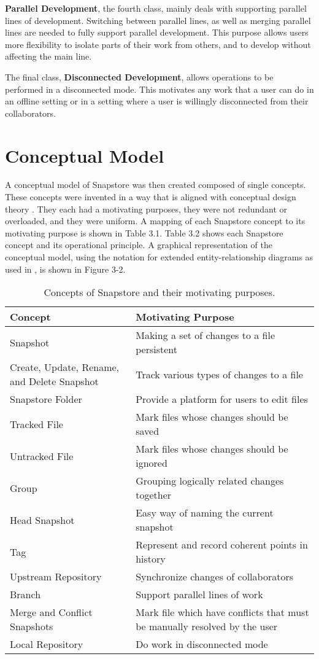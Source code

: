 \textbf{Parallel Development}, the fourth class, mainly deals with supporting parallel lines of development. Switching between parallel lines, as well as merging parallel lines are needed to fully support parallel development. This purpose allows users more flexibility to isolate parts of their work from others, and to develop without affecting the main line.

The final class, \textbf{Disconnected Development}, allows operations to be performed in a disconnected mode. This motivates any work that a user can do in an offline setting or in a setting where a user is willingly disconnected from their collaborators.

\section{Conceptual Model}

A conceptual model of Snapstore was then created composed of single concepts. These concepts were invented in a way that is aligned with conceptual design theory \cite{Jackson}. They each had a motivating purposes, they were not redundant or overloaded, and they were uniform. A mapping of each Snapstore concept to its motivating purpose is shown in Table 3.1. Table 3.2 shows each Snapstore concept and its operational principle. A graphical representation of the conceptual model, using the notation for extended entity-relationship diagrams as used in \cite{Jackson}, is shown in Figure 3-2.

\begin{table}
\begin{tabular}{ |p{5cm}||p{9cm}|}
 \hline
 \textbf{Concept} & \textbf{Motivating Purpose}\\[8pt]
 \hline
 Snapshot & Making a set of changes to a file persistent\\[8pt]
 Create, Update, Rename, and Delete Snapshot & Track various types of changes to a file\\[8pt]
 Snapstore Folder & Provide a platform for users to edit files\\[8pt]
 Tracked File & Mark files whose changes should be saved\\[8pt]
 Untracked File & Mark files whose changes should be ignored\\[8pt]
 \hline
 Group & Grouping logically related changes together\\[8pt]
 Head Snapshot & Easy way of naming the current snapshot\\[8pt]
 Tag & Represent and record coherent points in history\\[8pt]
 \hline
 Upstream Repository & Synchronize changes of collaborators\\[8pt]
 \hline
 Branch & Support parallel lines of work\\[8pt]
 Merge and Conflict Snapshots & Mark file which have conflicts that must be manually resolved by the user\\[8pt]
 \hline
 Local Repository & Do work in disconnected mode\\[8pt]
 \hline
\end{tabular}
\caption{Concepts of Snapstore and their motivating purposes.}
\end{table}

